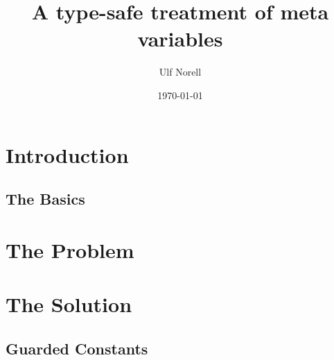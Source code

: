 \documentclass{beamer}
\title{A type-safe treatment of meta variables}
\author{Ulf Norell}
\date{\today}
\begin{document}
\frame{\titlepage}

\section{Introduction}
\frame{\tableofcontents}

\subsection{The Basics}

\section{The Problem}


\section{The Solution}

\subsection{Guarded Constants}


\end{document}
